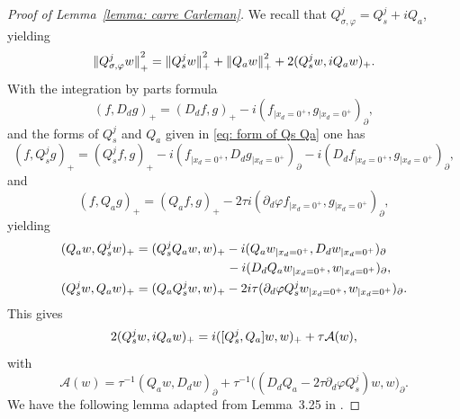\documentclass[JEP,XML,SOM,Unicode,published]{cedram}
\theoremstyle{plain}
\theoremstyle{definition}
\let \Re \relax
\DeclareMathOperator{\Re}{Re}
\newcommand{\inp}[2]{(#1, #2)}
\newcommand{\biginp}[2]{\big(#1, #2 \big)}
\newcommand{\br}{\ensuremath{_{|x_d=0^+}}}
\newcommand{\Norm}[2]{{\| #1 \|}_{#2}}
\newcommand{\Qconj}{Q_{\sigma,\varphi}}
\newcommand{\Qs}{Q_{s}}
\newcommand{\Qa}{Q_{a}}
\begin{document}
\begin{proof}[Proof of Lemma~\ref{lemma: carre Carleman}]
We recall that $\Qconj^j=\Qs^j+i\Qa$, yielding
\begin{equation}
\label{eq: carre Carleman}
\Norm{\Qconj^j w}{+}^2
=\Norm{\Qs^j w}{+}^2 +\Norm{\Qa w}{+}^2
+2\Re \inp{\Qs^jw}{i\Qa w}_+.
\end{equation}
With the integration by parts formula
\begin{equation*}
\inp{f}{D_d g}_+=\inp{D_d f}{g}_+- i \inp{f\br}{g\br}_{\partial},
\end{equation*}
and the forms of $\Qs^j$ and $\Qa$ given in \eqref{eq: form of Qs Qa} one has
\begin{equation*}
\inp{f}{\Qs^j g}_+ = \inp{\Qs^j f}{ g}_+
- i \inp{f\br}{D_d g\br}_{\partial} - i \inp{D_d f\br}{g\br}_{\partial},
\end{equation*}
and
\begin{equation*}
\inp{f}{\Qa g}_+ = \inp{\Qa f}{ g}_+
- 2 \tau i \inp{ \partial_d \varphi f\br}{ g\br}_{\partial},
\end{equation*}
yielding
\begin{align*}
\inp{\Qa w}{\Qs^jw}_+
&=\inp{\Qs^j\Qa w}{w}_+
-i \inp{\Qa w\br}{D_d w\br}_{\partial}\\
&\hspace*{2.55cm} -i \inp{D_d\Qa w\br}{w\br}_{\partial},\\
\inp{\Qs^jw}{\Qa w}_+
&=\inp{\Qa\Qs^jw}{w}_+
-2i\tau\inp{\partial_d\varphi \Qs^jw \br}{w\br}_{\partial}.
\end{align*}
This gives
\begin{equation}
\label{eq: double product after IPP}
2\Re \inp{\Qs^jw}{i\Qa w}_+
= i \inp{[\Qs^j,\Qa]w}{w}_+
+\tau\mathcal{A}(w),
\end{equation}
with
\begin{equation}
\label{eq: boundary quadratic form}
\mathcal{A}(w)
=\tau^{-1} \inp{\Qa w}{D_d w}_{\partial}
+\tau^{-1} \biginp{(D_d\Qa -2 \tau \partial_d\varphi \Qs^j)w}{w}_{\partial}.
\end{equation}
We have the following lemma adapted from Lemma~3.25 in \cite{JGL-vol1}.


\end{proof}
\end{document}
